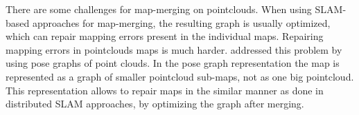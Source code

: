 There are some challenges for map-merging on pointclouds. When using \gls{SLAM}-based approaches for map-merging, the resulting graph is usually optimized, which can repair mapping errors present in the individual maps. Repairing mapping errors in pointclouds maps is much harder. \cite{bonanni2017pose} addressed this problem by using pose graphs of point clouds. In the pose graph representation the map is represented as a graph of smaller pointcloud sub-maps, not as one big pointcloud. This representation allows to repair maps in the similar manner as done in distributed \gls{SLAM} approaches, by optimizing the graph after merging.



